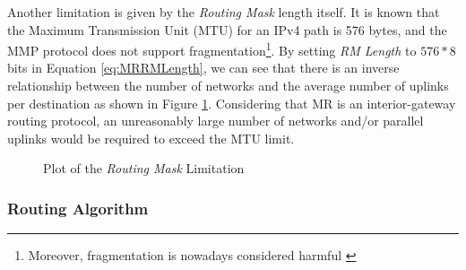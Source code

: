 Another limitation is given by the \textit{Routing Mask} length itself. It is
known that the Maximum Transmission Unit (MTU) for an IPv4 path is 576 bytes,
and the MMP protocol does not support fragmentation\footnote{Moreover,
fragmentation is nowadays considered harmful \cite{FragBad}}. By setting \textit{RM Length} to
$576 * 8$ bits in Equation \ref{eq:MRRMLength}, we can see that there is an
inverse relationship between the number of networks and the average number of
uplinks per destination as shown in Figure \ref{fig:LenLim}. Considering that MR
is an interior-gateway routing protocol, an unreasonably large number of networks
and/or parallel uplinks would be required to exceed the MTU limit. 


 \begin{figure}[htbp!]
 \begin{center}
 
 
 \end{center}
 \caption{Plot of the \textit{Routing Mask} Limitation}
 \label{fig:LenLim}
 \end{figure}


\subsubsection{Routing Algorithm}
\label{sect:MRAlgo}

